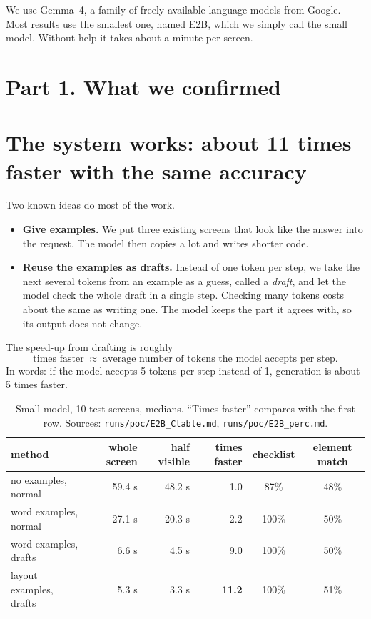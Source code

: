 \documentclass[10pt,a4paper]{article}
\begin{document}
We use Gemma~4, a family of freely available language models from Google. Most results use the smallest one, named E2B, which we simply call the small model. Without help it takes about a minute per screen.

\section*{Part 1. What we confirmed}

\section{The system works: about 11 times faster with the same accuracy}
Two known ideas do most of the work.
\begin{itemize}[itemsep=1pt]
\item \textbf{Give examples.} We put three existing screens that look like the answer into the request. The model then copies a lot and writes shorter code.
\item \textbf{Reuse the examples as drafts.} Instead of one token per step, we take the next several tokens from an example as a guess, called a \emph{draft}, and let the model check the whole draft in a single step. Checking many tokens costs about the same as writing one. The model keeps the part it agrees with, so its output does not change.
\end{itemize}
The speed-up from drafting is roughly
\begin{equation}
\text{times faster} \;\approx\; \text{average number of tokens the model accepts per step}.
\end{equation}
In words: if the model accepts 5 tokens per step instead of 1, generation is about 5 times faster.

\begin{table}[H]\centering\small
\caption{Small model, 10 test screens, medians. ``Times faster'' compares with the first row. Sources: \texttt{runs/poc/E2B\_Ctable.md}, \texttt{runs/poc/E2B\_perc.md}.}\label{tab:main}
\begin{tabular}{lrrrcc}
\toprule
method & whole screen & half visible & times faster & checklist & element match\\
\midrule
no examples, normal & 59.4 s & 48.2 s & 1.0 & 87\% & 48\%\\
word examples, normal & 27.1 s & 20.3 s & 2.2 & 100\% & 50\%\\
word examples, drafts & 6.6 s & 4.5 s & 9.0 & 100\% & 50\%\\
layout examples, drafts & 5.3 s & 3.3 s & \textbf{11.2} & 100\% & 51\%\\
\bottomrule
\end{tabular}
\end{table}
\end{document}
